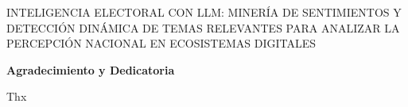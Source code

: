 \documentclass[listof=nochaptergap,12pt,times,authoryear]{report}
\newcommand\fillin[1][3cm]{\makebox[#1]{\dotfill}}
\begin{document}




\begin{center}
	\vspace*{10cm}
	{INTELIGENCIA ELECTORAL CON LLM: MINERÍA DE SENTIMIENTOS Y DETECCIÓN DINÁMICA DE TEMAS RELEVANTES PARA ANALIZAR LA PERCEPCIÓN NACIONAL EN ECOSISTEMAS DIGITALES}
\end{center}

\begin{center}
	{\large \bfseries  Agradecimiento y Dedicatoria}
\end{center}
\vspace{0.5cm}

Thx
\newline



\tableofcontents            %


\setcounter{secnumdepth}{3} %
\setcounter{tocdepth}{3}    %



\clearpage
\listoffigures
\clearpage
\listoftables  %
\clearpage
{}
\listofmyequations
\clearpage
\pagestyle{special}
\end{document}
